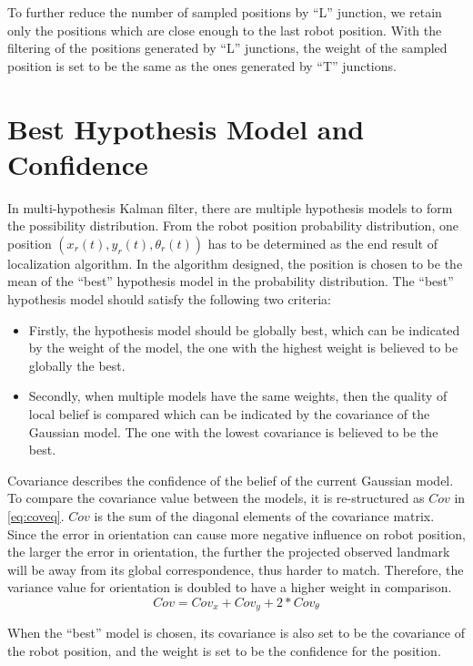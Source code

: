 To further reduce the number of sampled positions by ``L'' junction, we retain only the positions which are close enough to the last robot position. With the filtering of the positions generated by ``L'' junctions, the weight of the sampled position is set to be the same as the ones generated by ``T'' junctions.

\section{Best Hypothesis Model and Confidence}\label{sec:robotpose}
In multi-hypothesis Kalman filter, there are multiple hypothesis models to form the possibility distribution. From the robot position probability distribution, one position $(x_{r}(t), y_{r}(t), \theta_{r}(t))$
has to be determined as the end result of localization algorithm. In the algorithm designed, the position is chosen to be the mean of the ``best'' hypothesis model in the probability distribution. The  ``best'' hypothesis model should satisfy the following two criteria:
\begin{itemize}
  \item Firstly, the hypothesis model should be globally best, which can be indicated by the weight of the model, the one with the highest weight is believed to be globally the best.
   \item Secondly, when multiple models have the same weights, then the quality of local belief is compared which can be indicated by the covariance of the Gaussian model. The one with the lowest covariance is believed to be the best.
\end{itemize}

Covariance describes the confidence of the belief of the current Gaussian model. To compare the covariance value between the models, it is re-structured as $Cov$ in \autoref{eq:coveq}. $Cov$ is the sum of the diagonal elements of the covariance matrix. Since the error in orientation can cause more negative influence on robot position, \ie{} the larger the error in orientation, the further the projected observed landmark will be away from its global correspondence, thus harder to match. Therefore, the variance value for orientation is doubled to have a higher weight in comparison.
\begin{equation}
\label{eq:coveq}
Cov = Cov_x + Cov_y +2*Cov_{\theta}
\end{equation}

When the ``best'' model is chosen, its covariance is also set to be the covariance of the robot position, and the weight is set to be the confidence for the position.


